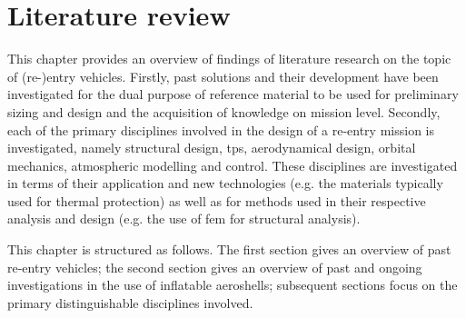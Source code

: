 \section{Literature review}\label{cha:litreview}
This chapter provides an overview of findings of literature research on the topic of (re-)entry vehicles. Firstly, past solutions and their development have been investigated for the dual purpose of reference material to be used for preliminary sizing and design and the acquisition of knowledge on mission level. Secondly, each of the primary disciplines involved in the design of a re-entry mission is investigated, namely structural design, \gls{tps}, aerodynamical design, orbital mechanics, atmospheric modelling and control. These disciplines are investigated in terms of their application and new technologies (e.g. the materials typically used for thermal protection) as well as for methods used in their respective analysis and design (e.g. the use of \gls{fem} for structural analysis).

This chapter is structured as follows. The first section gives an overview of past re-entry vehicles; the second section gives an overview of past and ongoing investigations in the use of inflatable aeroshells; subsequent sections focus on the primary distinguishable disciplines involved.






